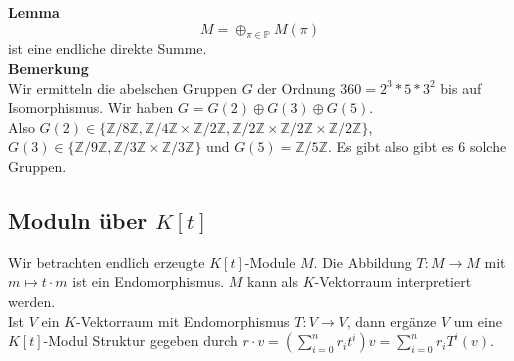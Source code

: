 \documentclass[a4paper, 12pt]{article}
\begin{document}
\textbf{Lemma} \[M = \oplus_{\pi \in \mathbb{P}} M(\pi)\] ist eine endliche direkte Summe.\\
\textbf{Bemerkung}\\
Wir ermitteln die abelschen Gruppen $G$ der Ordnung $360 = 2^3*5*3^2$ bis auf Isomorphismus. Wir haben $G = G(2) \oplus G(3) \oplus G(5)$.\\
Also $G(2) \in \{\mathbb{Z}/8\mathbb{Z}, \mathbb{Z}/4\mathbb{Z} \times \mathbb{Z}/2\mathbb{Z}, \mathbb{Z}/2\mathbb{Z}\times \mathbb{Z}/2\mathbb{Z}\times \mathbb{Z}/2\mathbb{Z}\}$, $G(3) \in \{\mathbb{Z}/9\mathbb{Z}, \mathbb{Z}/3\mathbb{Z}\times \mathbb{Z}/3\mathbb{Z}\}$ und $G(5) = \mathbb{Z}/5\mathbb{Z}$. Es gibt also gibt es 6 solche Gruppen.
\subsection{Moduln über $K[t]$}
Wir betrachten endlich erzeugte $K[t]$-Module $M$. Die Abbildung $T:M \to M$ mit $m \mapsto t \cdot m$ ist ein Endomorphismus. $M$ kann als $K$-Vektorraum interpretiert werden.\\

Ist $V$ ein $K$-Vektorraum mit Endomorphismus $T: V \to V$, dann ergänze $V$ um eine $K[t]$-Modul Struktur gegeben durch $r\cdot v = \left(\sum_{i=0}^n r_i t^i\right) v = \sum_{i=0}^n r_i T^i(v)$.
\end{document}
